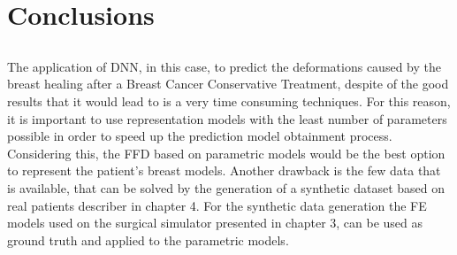 \chapter{Conclusions} \label{chap:concl}

\section*{}

The application of DNN, in this case, to predict the deformations caused by the breast healing after a Breast Cancer Conservative Treatment, despite of the good results that it would lead to is a very time consuming techniques. For this reason, it is important to use representation models with the least number of parameters possible in order to speed up the prediction model obtainment process. Considering this, the FFD based on parametric models would be the best option to represent the patient's breast models. Another drawback is the few data that is available, that can be solved by the generation of a synthetic dataset based on real patients describer in chapter 4. For the synthetic data generation the FE models used on the surgical simulator presented in chapter 3, can be used as ground truth and applied to the parametric models. 
